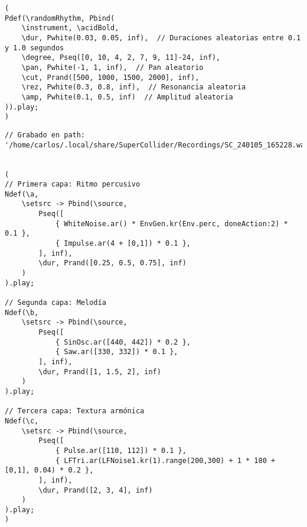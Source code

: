 \begin{minipage}[t]{1\textwidth}
\begin{lstlisting}[style=SuperCollider-IDE, basicstyle=\footnotesize\ttfamily, numbers=none]
(
Pdef(\randomRhythm, Pbind(
    \instrument, \acidBold,
    \dur, Pwhite(0.03, 0.05, inf),  // Duraciones aleatorias entre 0.1 y 1.0 segundos
    \degree, Pseq([0, 10, 4, 2, 7, 9, 11]-24, inf),
    \pan, Pwhite(-1, 1, inf),  // Pan aleatorio
    \cut, Prand([500, 1000, 1500, 2000], inf),
    \rez, Pwhite(0.3, 0.8, inf),  // Resonancia aleatoria
    \amp, Pwhite(0.1, 0.5, inf)  // Amplitud aleatoria
)).play;
)
    \end{lstlisting}
    \vspace{1cm}
\end{minipage}






\begin{minipage}[t]{1\textwidth}
    \centering
    \begin{lstlisting}[style=SuperCollider-IDE, basicstyle=\footnotesize\ttfamily, numbers=none]
// Grabado en path: '/home/carlos/.local/share/SuperCollider/Recordings/SC_240105_165228.wav'


(
// Primera capa: Ritmo percusivo
Ndef(\a,
    \setsrc -> Pbind(\source,
        Pseq([
            { WhiteNoise.ar() * EnvGen.kr(Env.perc, doneAction:2) * 0.1 },
            { Impulse.ar(4 + [0,1]) * 0.1 },
        ], inf),
        \dur, Prand([0.25, 0.5, 0.75], inf)
    )
).play;

// Segunda capa: Melodía
Ndef(\b,
    \setsrc -> Pbind(\source,
        Pseq([
            { SinOsc.ar([440, 442]) * 0.2 },
            { Saw.ar([330, 332]) * 0.1 },
        ], inf),
        \dur, Prand([1, 1.5, 2], inf)
    )
).play;

// Tercera capa: Textura armónica
Ndef(\c,
    \setsrc -> Pbind(\source,
        Pseq([
            { Pulse.ar([110, 112]) * 0.1 },
            { LFTri.ar(LFNoise1.kr(1).range(200,300) + 1 * 180 + [0,1], 0.04) * 0.2 },
        ], inf),
        \dur, Prand([2, 3, 4], inf)
    )
).play;
)     
    \end{lstlisting}
    \vspace{1cm}
\end{minipage}








